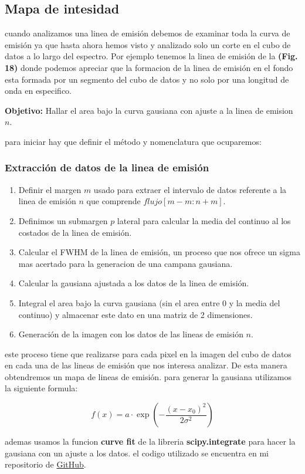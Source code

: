 \documentclass[9pt,twocolumn,a4paper]{opticajnl}
\begin{document}
\subsection*{Mapa de intesidad}
cuando analizamos una linea de emisión debemos de examinar toda la curva de emisión ya que hasta ahora hemos visto y analizado solo un corte en el cubo de datos a lo largo del espectro. Por ejemplo tenemos la linea de emisión de la \textbf{(Fig. 18)} donde podemos apreciar que la formacion de la linea de emisión en el fondo esta formada por un segmento del cubo de datos y no solo por una longitud de onda en especifico.

\textbf{Objetivo: } Hallar el area bajo la curva gausiana con ajuste a la linea de emision $n$. 

para iniciar hay que definir el método y nomenclatura que ocuparemos:
\subsubsection*{Extracción de datos de la linea de emisión}
\begin{enumerate}
  \item Definir el margen $m$ usado para extraer el intervalo de datos referente a la linea de emisión $n$ que comprende $flujo[m-m:n+m]$.
  \item Definimos un submargen $p$ lateral para calcular la media del continuo al los costados de la linea de emisión.
  \item Calcular el FWHM de la linea de emisión, un proceso que nos ofrece un sigma mas acertado para la generacion de una campana gausiana.
  \item Calcular la gausiana ajustada a los datos de la linea de emisión.
  \item Integral el area bajo la curva gausiana (sin el area entre 0 y la media del continuo) y almacenar este dato en una matriz de 2 dimensiones.
  \item Generación de la imagen con los datos de las lineas de emisión $n$.
\end{enumerate}

este proceso tiene que realizarse para cada pixel en la imagen del cubo de datos en cada una de las lineas de emisión que nos interesa analizar. De esta manera obtendremos un mapa de lineas de emisión.
para generar la gausiana utilizamos la siguiente formula:

$$
f(x) = a \cdot \exp\left( -\frac{(x - x_0)^2}{2\sigma^2} \right)
$$

ademas usamos la funcion \textbf{curve fit} de la libreria \textbf{scipy.integrate} para hacer la gausiana con un ajuste a los datos.
el codigo utilizado se encuentra en mi repositorio de \href{https://github.com/renatosanz/delfin}{GitHub}. 
\end{document}
